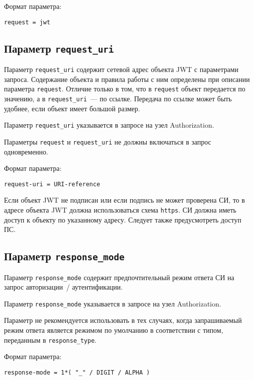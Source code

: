 Формат параметра:
\begin{lstlisting}
request = jwt
\end{lstlisting}

\subsection{Параметр \lstinline{request_uri}}\label{PARAMS.RequestUri} 

Параметр \lstinline{request_uri} содержит сетевой адрес объекта JWT с параметрами 
запроса. Содержание объекта и правила работы с ним определены при описании
параметра \lstinline{request}. Отличие только в том, что в \lstinline{request}
объект передается по значению, а в \lstinline{request_uri}~--- по ссылке.
%
Передача по ссылке может быть удобнее, если объект имеет большой размер.

Параметр \lstinline{request_uri} указывается в запросе на узел Authorization.

Параметры \lstinline{request} и \lstinline{request_uri} не должны включаться в 
запрос одновременно. 

Формат параметра:
\begin{lstlisting}
request-uri = URI-reference
\end{lstlisting}

Если объект JWT не подписан или если подпись не может проверена СИ, 
то в адресе объекта JWT должна использоваться схема \lstinline{https}.
%
СИ должна иметь доступ к объекту по указанному адресу.
%
Следует также предусмотреть доступ ПС.

\subsection{Параметр \lstinline{response_mode}}\label{PARAMS.RespMode} 

Параметр \lstinline{response_mode} содержит предпочтительный режим ответа СИ на 
запрос авторизации~/ аутентификации.

Параметр \lstinline{response_mode} указывается в запросе на узел Authorization.

Параметр не рекомендуется использовать в тех случаях, когда запрашиваемый 
режим ответа является режимом по умолчанию в соответствии с типом, переданным
в \lstinline{response_type}. 
%

Формат параметра:
\begin{lstlisting}
response-mode = 1*( "_" / DIGIT / ALPHA )
\end{lstlisting}

